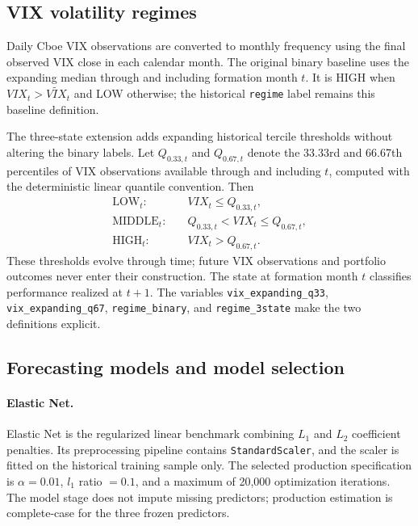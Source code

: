 \subsection{VIX volatility regimes}

Daily Cboe VIX observations are converted to monthly frequency using the final observed VIX close in each calendar month. The original binary baseline uses the expanding median through and including formation month $t$. It is HIGH when $VIX_t>\widetilde{VIX}_t$ and LOW otherwise; the historical \texttt{regime} label remains this baseline definition.

The three-state extension adds expanding historical tercile thresholds without altering the binary labels. Let $Q_{0.33,t}$ and $Q_{0.67,t}$ denote the 33.33rd and 66.67th percentiles of VIX observations available through and including $t$, computed with the deterministic linear quantile convention. Then
\begin{equation}
\begin{aligned}
\mathrm{LOW}_t: \quad &VIX_t\leq Q_{0.33,t}, \\
\mathrm{MIDDLE}_t: \quad &Q_{0.33,t}<VIX_t\leq Q_{0.67,t}, \\
\mathrm{HIGH}_t: \quad &VIX_t>Q_{0.67,t}.
\end{aligned}
\end{equation}
These thresholds evolve through time; future VIX observations and portfolio outcomes never enter their construction. The state at formation month $t$ classifies performance realized at $t+1$. The variables \texttt{vix\_expanding\_q33}, \texttt{vix\_expanding\_q67}, \texttt{regime\_binary}, and \texttt{regime\_3state} make the two definitions explicit.

\subsection{Forecasting models and model selection}

\paragraph{Elastic Net.}
Elastic Net is the regularized linear benchmark combining $L_1$ and $L_2$ coefficient penalties. Its preprocessing pipeline contains \texttt{StandardScaler}, and the scaler is fitted on the historical training sample only. The selected production specification is $\alpha=0.01$, $l_1$ ratio $=0.1$, and a maximum of 20,000 optimization iterations. The model stage does not impute missing predictors; production estimation is complete-case for the three frozen predictors.

